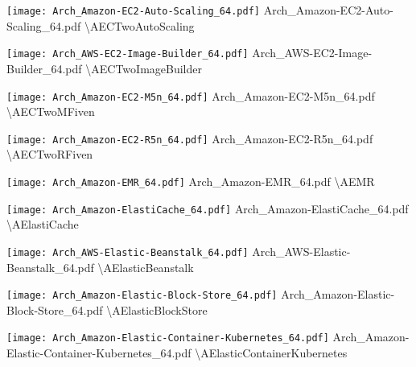  {\texttt{[image: Arch\_Amazon-EC2-Auto-Scaling\_64.pdf]}} {Arch\_Amazon-EC2-Auto-Scaling\_64.pdf} {{\textbackslash}AECTwoAutoScaling}

 {\texttt{[image: Arch\_AWS-EC2-Image-Builder\_64.pdf]}} {Arch\_AWS-EC2-Image-Builder\_64.pdf} {{\textbackslash}AECTwoImageBuilder}

 {\texttt{[image: Arch\_Amazon-EC2-M5n\_64.pdf]}} {Arch\_Amazon-EC2-M5n\_64.pdf} {{\textbackslash}AECTwoMFiven}

 {\texttt{[image: Arch\_Amazon-EC2-R5n\_64.pdf]}} {Arch\_Amazon-EC2-R5n\_64.pdf} {{\textbackslash}AECTwoRFiven}

 {\texttt{[image: Arch\_Amazon-EMR\_64.pdf]}} {Arch\_Amazon-EMR\_64.pdf} {{\textbackslash}AEMR}

 {\texttt{[image: Arch\_Amazon-ElastiCache\_64.pdf]}} {Arch\_Amazon-ElastiCache\_64.pdf} {{\textbackslash}AElastiCache}

 {\texttt{[image: Arch\_AWS-Elastic-Beanstalk\_64.pdf]}} {Arch\_AWS-Elastic-Beanstalk\_64.pdf} {{\textbackslash}AElasticBeanstalk}

 {\texttt{[image: Arch\_Amazon-Elastic-Block-Store\_64.pdf]}} {Arch\_Amazon-Elastic-Block-Store\_64.pdf} {{\textbackslash}AElasticBlockStore}

 {\texttt{[image: Arch\_Amazon-Elastic-Container-Kubernetes\_64.pdf]}} {Arch\_Amazon-Elastic-Container-Kubernetes\_64.pdf} {{\textbackslash}AElasticContainerKubernetes}

